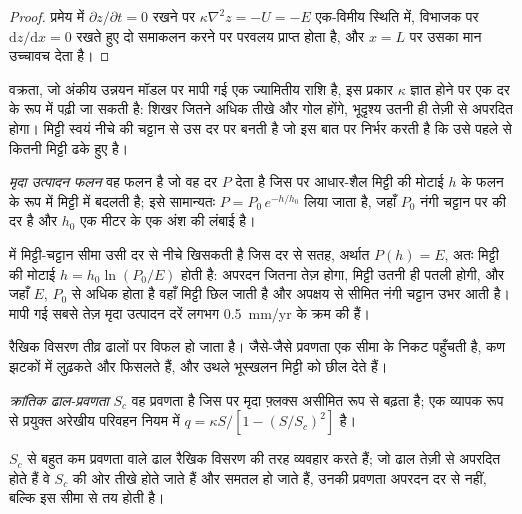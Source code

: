 \begin{proof}
प्रमेय में $\partial z/\partial t = 0$ रखने पर $\kappa\nabla^2 z =
-U = -E$ एक-विमीय स्थिति में, विभाजक पर $\mathrm{d}z/\mathrm{d}x =
0$ रखते हुए दो समाकलन करने पर परवलय प्राप्त होता है, और $x = L$ पर उसका मान उच्चावच देता है।
\end{proof}

वक्रता, जो अंकीय उन्नयन मॉडल पर मापी गई एक ज्यामितीय राशि है, इस प्रकार
$\kappa$ ज्ञात होने पर एक दर के रूप में पढ़ी जा सकती है: शिखर जितने अधिक तीखे और गोल होंगे,
भूदृश्य उतनी ही तेज़ी से अपरदित होगा। मिट्टी स्वयं नीचे की चट्टान से
उस दर पर बनती है जो इस बात पर निर्भर करती है कि उसे पहले से कितनी मिट्टी ढके हुए है।

\begin{definition}[मृदा उत्पादन फलन]\label{def:b3:quantitative-geomorphology:soil-production}
\emph{मृदा उत्पादन फलन} वह फलन है जो वह दर $P$ देता है
जिस पर आधार-शैल मिट्टी की मोटाई $h$ के फलन के रूप में मिट्टी में बदलती है;
इसे सामान्यतः $P = P_0\,e^{-h/h_0}$ लिया जाता है, जहाँ
$P_0$ नंगी चट्टान पर की दर है और $h_0$ एक मीटर के एक अंश की लंबाई है।
\end{definition}

 में मिट्टी-चट्टान सीमा उसी दर से नीचे खिसकती है जिस दर से सतह,
अर्थात $P(h) = E$, अतः मिट्टी की मोटाई $h = h_0 \ln(P_0/E)$ होती है: अपरदन जितना तेज़ होगा,
मिट्टी उतनी ही पतली होगी, और जहाँ $E$, $P_0$ से अधिक होता है वहाँ मिट्टी छिल जाती है
और अपक्षय से सीमित नंगी चट्टान उभर आती है। मापी गई सबसे तेज़ मृदा उत्पादन दरें
लगभग \qty{0.5}{mm/yr} के क्रम की हैं।

रैखिक विसरण तीव्र ढालों पर विफल हो जाता है।
जैसे-जैसे प्रवणता एक सीमा के निकट पहुँचती है, कण झटकों में
लुढ़कते और फिसलते हैं, और उथले भूस्खलन मिट्टी को छील देते हैं।

\begin{definition}[क्रांतिक ढाल-प्रवणता]\label{def:b3:quantitative-geomorphology:critical}
\emph{क्रांतिक ढाल-प्रवणता}
$S_c$ वह प्रवणता है जिस पर मृदा फ़्लक्स असीमित रूप से बढ़ता है;
एक व्यापक रूप से प्रयुक्त अरेखीय परिवहन नियम में $q = \kappa S/[1 - (S/S_c)^2]$ है।
\end{definition}

$S_c$ से बहुत कम प्रवणता वाले ढाल रैखिक विसरण की तरह व्यवहार करते हैं;
जो ढाल तेज़ी से अपरदित होते हैं वे $S_c$ की ओर तीखे होते जाते हैं
और समतल हो जाते हैं, उनकी प्रवणता अपरदन दर से नहीं, बल्कि इस सीमा से तय होती है।

